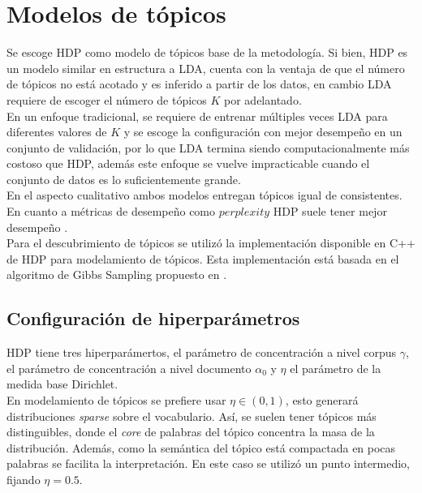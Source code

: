 \section{Modelos de tópicos}
\label{sec:model_selected}

Se escoge HDP como modelo de tópicos base de la metodología. Si bien, HDP es un modelo similar en estructura a LDA, cuenta con la ventaja de que el número de tópicos no está acotado y es inferido a partir de los datos, en cambio LDA requiere de escoger el número de tópicos $K$ por adelantado. \\

En un enfoque tradicional, se requiere de entrenar múltiples veces LDA para diferentes valores de $K$ y se escoge la configuración con mejor desempeño en un conjunto de validación, por lo que LDA termina siendo computacionalmente más costoso que HDP, además este enfoque se vuelve impracticable cuando el conjunto de datos es lo suficientemente grande. \\

En el aspecto cualitativo ambos modelos entregan tópicos igual de consistentes. En cuanto a métricas de desempeño como $\textit{perplexity}$ HDP suele tener mejor desempeño \citep{teh2005sharing}.\\

Para el descubrimiento de tópicos se utilizó la implementación disponible en C++ \citep{HDP} de HDP para modelamiento de tópicos. Esta implementación está basada en el algoritmo de Gibbs Sampling propuesto en \citep{teh2005sharing}.

\subsection{Configuración de hiperparámetros}
\label{sec:hdp_hiperparameters}

HDP tiene tres hiperparámertos, el parámetro de concentración a nivel corpus $\gamma$, el parámetro de concentración a nivel documento $\alpha_{0}$ y $\eta$ el parámetro de la medida base Dirichlet.\\

En modelamiento de tópicos se prefiere usar $\eta\in (0,1)$, esto generará distribuciones \textit{sparse} sobre el vocabulario. Así, se suelen tener tópicos más distinguibles, donde el \textit{core} de palabras del tópico concentra la masa de la distribución. Además, como la semántica del tópico está compactada en pocas palabras se facilita la interpretación. En este caso se utilizó un punto intermedio, fijando $\eta=0.5$.\\ 

